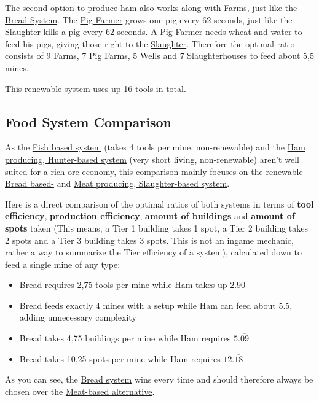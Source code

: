\documentclass[11pt]{article}
\begin{document}
The second option to produce ham also works along with \hyperref[farm]{Farms}, just like the \hyperref[bread]{Bread System}. The \hyperref[pigfarm]{Pig Farmer} grows one pig every 62 seconds, just like the \hyperref[slaughterhouse]{Slaughter} kills a pig every 62 seconds. A \hyperref[pigfarm]{Pig Farmer} needs wheat and water to feed his pigs, giving those right to the \hyperref[slaughterhouse]{Slaughter}. Therefore the optimal ratio consists of 9 \hyperref[farm]{Farms}, 7 \hyperref[pigfarm]{Pig Farms}, 5 \hyperref[well]{Wells} and 7 \hyperref[slaughterhouse]{Slaughterhouses} to feed about 5,5 mines.

This renewable system uses up 16 tools in total.

\subsection{Food System Comparison}
\label{sec:foodsystemcomparison}

As the \hyperref[fish]{Fish based system} (takes 4 tools per mine, non-renewable) and the \hyperref[hamhunter]{Ham producing, Hunter-based system} (very short living, non-renewable) aren't well suited for a rich ore economy, this comparison mainly focuses on the renewable \hyperref[bread]{Bread based-} and \hyperref[hamslaughter]{Meat producing, Slaughter-based system}.

Here is a direct comparison of the optimal ratios of both systems in terms of \textbf{tool efficiency}, \textbf{production efficiency}, \textbf{amount of buildings} and \textbf{amount of spots} taken (This means, a Tier 1 building takes 1 spot, a Tier 2 building takes 2 spots and a Tier 3 building takes 3 spots. This is not an ingame mechanic, rather a way to summarize the Tier efficiency of a system), calculated down to feed a single mine of any type:

\begin{itemize}
  \item Bread requires 2,75 tools per mine while Ham takes up $2.\overline{90}$
  \item Bread feeds exactly 4 mines with a setup while Ham can feed about 5.5, adding unnecessary complexity
  \item Bread takes 4,75 buildings per mine while Ham requires $5.\overline{09}$
  \item Bread takes 10,25 spots per mine while Ham requires $12.\overline{18}$
\end{itemize}

As you can see, the \hyperref[bread]{Bread system} wins every time and should therefore always be chosen over the \hyperref[hamslaughter]{Meat-based alternative}.
\end{document}
